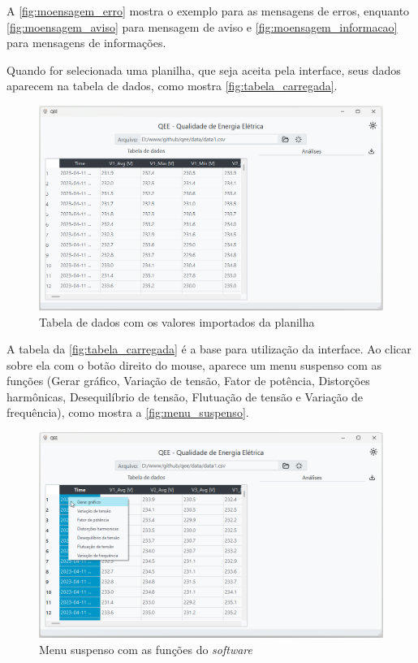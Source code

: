 A \autoref{fig:moensagem_erro} mostra o exemplo para as mensagens de erros, enquanto \autoref{fig:moensagem_aviso} para mensagem de aviso e \autoref{fig:moensagem_informacao} para mensagens de informações.

Quando for selecionada uma planilha, que seja aceita pela interface, seus dados aparecem na tabela de dados, como mostra \autoref{fig:tabela_carregada}.

\begin{figure}[H]
  \centering
  \caption{Tabela de dados com os valores importados da planilha}
  \label{fig:tabela_carregada}
  \includegraphics[width=15cm]{illustrations/figures/tabela_carregada.png}
\end{figure}

A tabela da \autoref{fig:tabela_carregada} é a base para utilização da interface. Ao clicar sobre ela com o botão direito do mouse, aparece um menu suspenso com as funções (Gerar gráfico, Variação de tensão, Fator de potência, Distorções harmônicas, Desequilíbrio de tensão, Flutuação de tensão e Variação de frequência), como mostra a \autoref{fig:menu_suspenso}.

\begin{figure}[H]
  \centering
  \caption{Menu suspenso com as funções do \textit{software}}
  \label{fig:menu_suspenso}
  \includegraphics[width=15cm]{illustrations/figures/menu_suspenso.png}
\end{figure}


